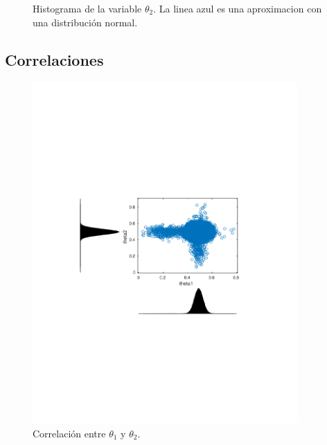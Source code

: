 \begin{figure}[H]
\begin{minipage}{0.5\textwidth}
	\caption{\footnotesize Histograma de la variable $\theta_2$. La linea azul es una aproximacion con una distribución normal.}
\end{minipage}
\end{figure}

\subsection{Correlaciones}


\begin{figure}[H]
\begin{minipage}{0.5\textwidth}
 \centering
	\includegraphics[width=0.9\textwidth]{imgs/theta1_2.png}
	\caption{\footnotesize Correlación entre $\theta_1$ y $\theta_2$.}
	\label{fig:problema2-promedio}
\end{minipage}
\begin{minipage}{0.5\textwidth}
 \centering

\end{minipage}
\end{figure}
